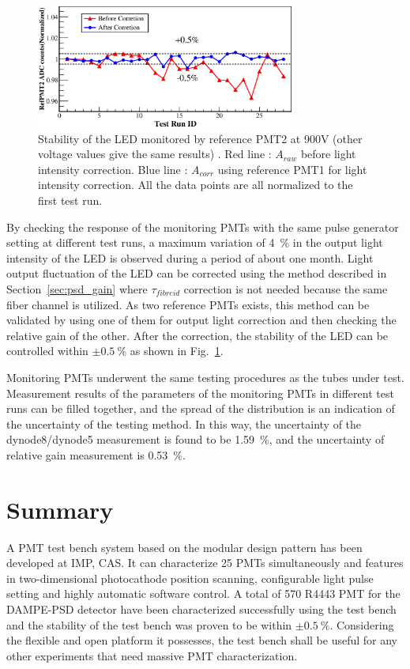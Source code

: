 \documentclass{nst}
\providecommand{\DIFadd}[1]{{\protect\color{yellow} \sf #1}} %
\providecommand{\DIFaddbegin}{} %
\providecommand{\DIFaddend}{} %
\providecommand{\DIFdelbegin}{} %
\providecommand{\DIFdelend}{} %
\begin{document}
\begin{figure}[!htb]
	\centering
	\includegraphics[width=85mm]{FIG10}
	\caption{Stability of the LED monitored by reference PMT2 at 900V (other voltage values give the same results) . Red line : $A_{raw}$ before light intensity correction. Blue line : $A_{corr}$ using reference PMT1 for light intensity correction. All the data points are all normalized to the first test run.}
	\label{fig:FIG10}
\end{figure} 

By checking the response of the monitoring PMTs with the same pulse generator setting at different test runs, a maximum variation of \SI{4}{\percent} in the output light intensity of the LED is observed during a period of about one month.
Light output fluctuation of the LED can be corrected using the method described in Section~\ref{sec:psd_gain} where $\tau_{fibreid}$ correction is not needed because the same fiber channel is utilized.
As two reference PMTs exists, this method can be validated by using one of them for output light correction and then checking the relative gain of the other. 
After the correction, the stability of the LED can be controlled within $\pm\SI{0.5}{\percent}$ as shown in Fig.~\ref{fig:FIG10}.

Monitoring PMTs underwent the same testing procedures as the tubes under test.
Measurement results of the parameters of the monitoring PMTs in different test runs can be filled together, and the spread of the distribution is an indication of the uncertainty of the testing method.
In this way, the uncertainty of the dynode8/dynode5 measurement is found to be \SI{1.59}{\percent}, and the uncertainty of relative gain measurement is \SI{0.53}{\percent}. 

\section{Summary}
\label{sec:summary}
A \DIFdelbegin \DIFdelend PMT test bench system \DIFaddbegin \DIFadd{based on the modular design pattern }\DIFaddend has been developed at IMP, CAS.
It \DIFdelbegin \DIFdelend \DIFaddbegin \DIFadd{can characterize 25 PMTs simultaneously and features in two-dimensional photocathode position scanning, configurable light pulse setting and highly automatic software control. A total of 570 R4443 PMT for the DAMPE-PSD detector have been characterized successfully using the test bench and the stability of the test bench was proven to be within $\pm\SI{0.5}{\percent}$}\DIFaddend .
Considering the flexible and open platform it possesses, the test bench \DIFdelbegin \DIFdelend \DIFaddbegin \DIFadd{shall be }\DIFaddend useful for any other \DIFdelbegin \DIFdelend \DIFaddbegin \DIFadd{experiments }\DIFaddend that need massive PMT characterization. 
\end{document}
